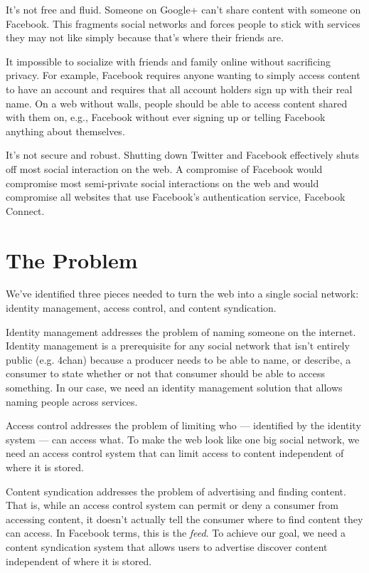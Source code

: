 \documentclass[pdftex,12pt,a4papaer,twoside,notitlepage]{report}
\begin{document}
It's not free and fluid. Someone on Google+ can't share content with someone on
Facebook. This fragments social networks and forces people to stick with
services they may not like simply because that's where their friends are.

It impossible to socialize with friends and family online without sacrificing
privacy. For example, Facebook requires anyone wanting to simply access content
to have an account and requires that all account holders sign up with their real
name. On a web without walls, people should be able to access content shared
with them on, e.g., Facebook without ever signing up or telling Facebook
anything about themselves.

It's not secure and robust. Shutting down Twitter and Facebook effectively shuts
off most social interaction on the web. A compromise of Facebook would
compromise most semi-private social interactions on the web and would compromise
all websites that use Facebook's authentication service, Facebook Connect.

\section{The Problem}

We've identified three pieces needed to turn the web into a single social
network: identity management, access control, and content syndication.

Identity management addresses the problem of naming someone on the internet.
Identity management is a prerequisite for any social network that isn't entirely
public (e.g. 4chan) because a producer needs to be able to name, or describe, a
consumer to state whether or not that consumer should be able to access
something. In our case, we need an identity management solution that allows
naming people across services.

Access control addresses the problem of limiting who --- identified by the
identity system --- can access what. To make the web look like one big social
network, we need an access control system that can limit access to content
independent of where it is stored.

Content syndication addresses the problem of advertising and finding content.
That is, while an access control system can permit or deny a consumer from
accessing content, it doesn't actually tell the consumer where to find content
they can access. In Facebook terms, this is the \emph{feed}. To achieve our
goal, we need a content syndication system that allows users to advertise
discover content independent of where it is stored.
\end{document}
